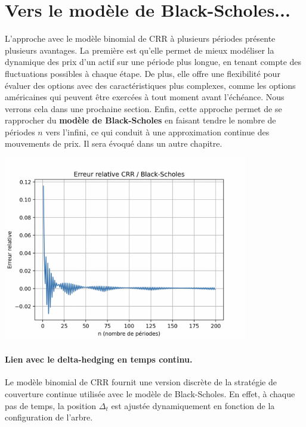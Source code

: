 \documentclass[12pt,a4paper]{article}
\begin{document}

\section{Vers le modèle de Black-Scholes...}

L'approche avec le modèle binomial de CRR à plusieurs périodes présente plusieurs avantages. La première est qu'elle permet de mieux modéliser la dynamique des prix d'un actif sur une période plus longue, en tenant compte des fluctuations possibles à chaque étape. De plus, elle offre une flexibilité pour évaluer des options avec des caractéristiques plus complexes, comme les options américaines qui peuvent être exercées à tout moment avant l'échéance. Nous verrons cela dans une prochaine section. Enfin, cette approche permet de se rapprocher du \textbf{modèle de Black-Scholes} en faisant tendre le nombre de périodes $n$ vers l'infini, ce qui conduit à une approximation continue des mouvements de prix. Il sera évoqué dans un autre chapitre.
\begin{center}
    \includegraphics[width=0.8\textwidth]{../tp_crr/error_plot.png}
\end{center}

\paragraph{Lien avec le delta-hedging en temps continu.} Le modèle binomial de CRR fournit une version discrète de la stratégie de couverture continue utilisée avec le modèle de Black-Scholes. En effet, à chaque pas de temps, la position \(\Delta_t\) est ajustée dynamiquement en fonction de la configuration de l’arbre.
\end{document}
